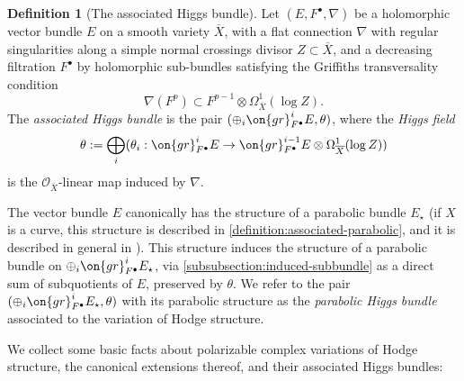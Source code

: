 \documentclass[12 pt]{amsart}
\theoremstyle{plain}
\theoremstyle{definition}
\newtheorem{definition}[subsubsection]{Definition}
\theoremstyle{remark}
\numberwithin{equation}{section}
\begin{document}
\begin{definition}[The associated Higgs bundle]
    Let $(E, F^\bullet, \nabla)$ be a holomorphic vector bundle $E$ on a smooth variety $\overline{X}$, with a flat connection $\nabla$ with regular singularities along a simple normal crossings divisor $Z\subset\overline{X}$, and a decreasing filtration $F^\bullet$ by holomorphic sub-bundles satisfying the Griffiths transversality condition \begin{equation}\label{eqn:griffiths-transversality-2} \nabla(F^p)\subset F^{p-1}\otimes \Omega^1_{\overline{X}}(\log Z).\end{equation} The \emph{associated Higgs bundle} is the pair $(\oplus_i \on{gr}^i_{F^\bullet}E, \theta)$, where the \emph{Higgs field} $$\theta:=\bigoplus_i (\theta_i: \on{gr}^i_{F^\bullet}E\to \on{gr}^{i-1}_{F^\bullet}E\otimes\Omega^1_{\overline{X}}(\log Z))$$ is the $\mathscr{O}_{\overline{X}}$-linear map induced by $\nabla.$
    
    The vector bundle $E$ canonically has the structure of a parabolic bundle
    $E_\star$
    (if $X$ is a curve, this structure is described in
    \autoref{definition:associated-parabolic}, and it is
    described in general in \cite[Proposition 5.4]{arapura2019vanishing}).
    This structure induces the structure of a parabolic bundle on $\oplus_i
    \on{gr}^i_{F^\bullet} E_\star$, via
    \autoref{subsubsection:induced-subbundle} as a direct sum of subquotients of $E$,
    preserved by $\theta$. We refer to the pair $(\oplus_i
    \on{gr}^i_{F^\bullet}E_\star, \theta)$ with its parabolic structure as the \emph{parabolic Higgs bundle} associated to the variation of Hodge structure.
\end{definition}
We collect some basic facts about polarizable complex variations of Hodge structure, the canonical extensions thereof, and their associated Higgs bundles:
\end{document}
